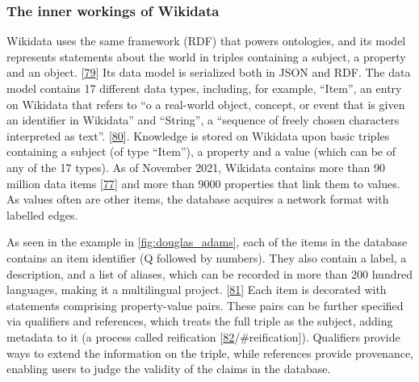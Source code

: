 \hypertarget{the-inner-workings-of-wikidata}{%
\subsubsection{The inner workings of Wikidata}\label{the-inner-workings-of-wikidata}}

Wikidata uses the same framework (RDF) that powers ontologies, and its model represents statements about the world in triples containing a subject, a property and an object. {[}\protect\hyperlink{ref-Ea6hVYrD}{79}{]}
Its data model is serialized both in JSON and RDF.
The data model contains 17 different data types, including, for example, ``Item'', an entry on Wikidata that refers to ``o a real-world object, concept, or event that is given an identifier in Wikidata'' and ``String'', a ``sequence of freely chosen characters interpreted as text''. {[}\protect\hyperlink{ref-17Yt10yrY}{80}{]}.
Knowledge is stored on Wikidata upon basic triples containing a subject (of type ``Item''), a property and a value (which can be of any of the 17 types).
As of November 2021, Wikidata contains more than 90 million data items {[}\protect\hyperlink{ref-SGzjBOG0}{77}{]} and more than 9000 properties that link them to values.
As values often are other items, the database acquires a network format with labelled edges.

As seen in the example in \ref{fig:douglas_adams}, each of the items in the database contains an item identifier (Q followed by numbers).
They also contain a label, a description, and a list of aliases, which can be recorded in more than 200 hundred languages, making it a multilingual project. {[}\protect\hyperlink{ref-S1Lksw7i}{81}{]}
Each item is decorated with statements comprising property-value pairs.
These pairs can be further specified via qualifiers and references, which treats the full triple as the subject, adding metadata to it (a process called reification {[}\protect\hyperlink{ref-ZhP1mKyl}{82}/\#reification{]}).
Qualifiers provide ways to extend the information on the triple, while references provide provenance, enabling users to judge the validity of the claims in the database.

